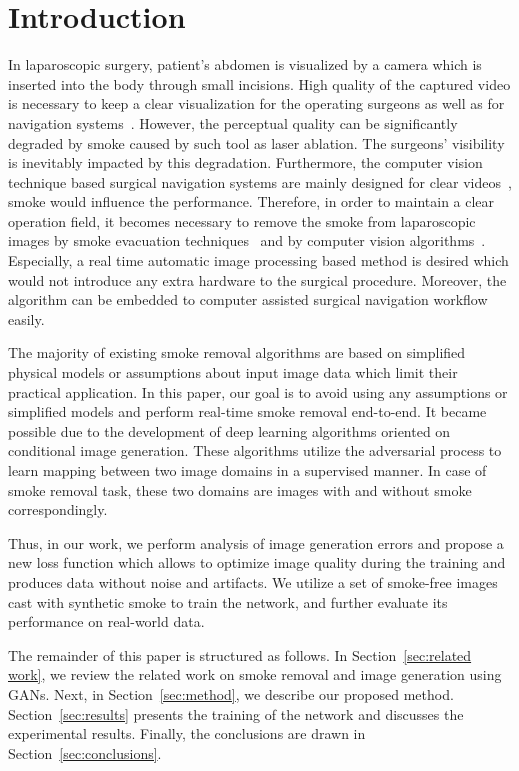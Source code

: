 \documentclass[pmlr]{jmlr}
\begin{document}
\section{Introduction}
\label{intro}
In laparoscopic surgery, patient's abdomen is visualized by a camera which is inserted into the body through small incisions. High quality of the captured video is necessary to keep a clear visualization for the operating surgeons as well as for navigation systems~\citep{stoyanov2012surgical, andrea2018validation}. However, the perceptual quality can be significantly degraded by smoke caused by such tool as laser ablation. The surgeons' visibility is inevitably impacted by this degradation.    Furthermore, the computer vision technique based surgical navigation systems are mainly designed for clear videos~\citep{andrea2018validation,wang2018liver}, smoke would influence the performance. Therefore, in order to maintain a clear operation field, it becomes necessary to remove the smoke from laparoscopic images by smoke evacuation techniques~\citep{lawrentschuk2010laparoscopic} and by computer vision algorithms~\citep{wang2018variational}. Especially, a real time automatic image 
processing based method is desired which would not introduce any extra hardware to the surgical procedure. Moreover, the algorithm can be embedded to computer assisted surgical navigation workflow easily. 
\par 
The majority of existing smoke removal algorithms are based on simplified physical models or assumptions about input image data which limit their practical application. In this paper, our goal is to avoid using any assumptions or simplified models and perform real-time smoke removal end-to-end. It became possible due to the development of deep learning algorithms oriented on conditional image generation. These algorithms utilize the adversarial process to learn mapping between two image domains in a supervised manner. In case of smoke removal task, these two domains are images with and without smoke correspondingly. 
\par 
Thus, in our work, we perform analysis of image generation errors and propose a new loss function which allows to optimize image quality during the training and produces data without noise and artifacts.  We utilize a set of smoke-free images cast with synthetic smoke to train the network, and further evaluate its performance on real-world data. 
\par 
The remainder of this paper is structured as follows. In Section~\ref{sec:related work}, we review the related work on smoke removal and image generation using GANs. Next, in Section~\ref{sec:method}, we describe our proposed method. Section~\ref{sec:results} presents the training of the network and discusses the experimental results. Finally, the conclusions are drawn in Section~\ref{sec:conclusions}.
\end{document}
